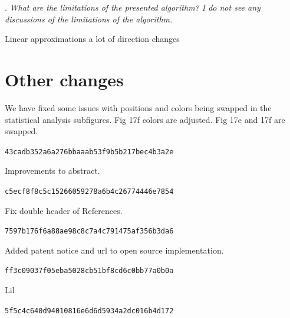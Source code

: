 \documentclass[5p,twocolumn,10pt,times]{elsarticle}
\theoremstyle{definition}
\newcommand{\commits}[1]{{\bf\begin{alltt} {#1}\end{alltt}}}
\newcommand\Que[1]{%
   \leavevmode\par
   \stepcounter{question}
   \noindent
   \thequestion. {\it#1}\par}
\newcounter{question}
\numberwithin{question}{section}
\begin{document}
\Que{
What are the limitations of the presented algorithm? I do not see any discussions of the limitations of the algorithm.
}
Linear approximations 
a lot of direction changes














\section{Other changes}
We have fixed some issues with positions and colors being swapped in the statistical analysis subfigures.
Fig 17f colors are adjusted.
Fig 17e and 17f are swapped.
\commits{43cadb352a6a276bbaaab53f9b5b217bec4b3a2e}

Improvements to abstract.
\commits{c5ecf8f8c5c15266059278a6b4c26774446e7854}

Fix double header of References.
\commits{7597b176f6a88ae98c8c7a4c791475af356b3da6}

Added patent notice and url to open source implementation.
\commits{ff3c09037f05eba5028cb51bf8cd6c0bb77a0b0a}

Lil
\commits{5f5c4c640d94010816e6d6d5934a2dc016b4d172}
\end{document}
